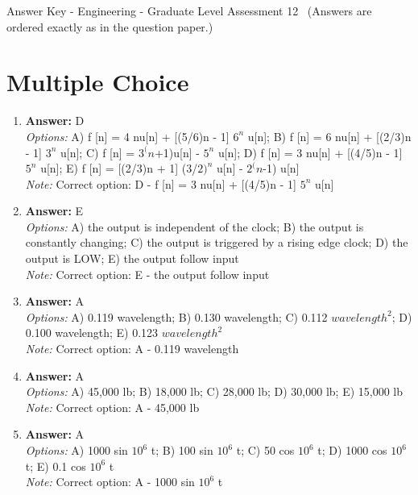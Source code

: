 \documentclass[12pt]{article}
\begin{document}
\begin{center}
Answer Key - Engineering - Graduate Level Assessment 12 \
\small (Answers are ordered exactly as in the question paper.)
\end{center}

\section*{Multiple Choice}
\begin{enumerate}[label=\arabic*.]
\item \textbf{Answer:} D
\\ \textit{Options:} A) f [n] = 4 nu[n] + [(5/6)n - 1] $6^n$ u[n]; B) f [n] = 6 nu[n] + [(2/3)n - 1] $3^n$ u[n]; C) f [n] = $3^(n$+1)u[n] - $5^n$ u[n]; D) f [n] = 3 nu[n] + [(4/5)n - 1] $5^n$ u[n]; E) f [n] = [(2/3)n + 1] (3/$2)^n$ u[n] - $2^(n$-1) u[n]
\\ \textit{Note:} Correct option: D - f [n] = 3 nu[n] + [(4/5)n - 1] $5^n$ u[n]
\item \textbf{Answer:} E
\\ \textit{Options:} A) the output is independent of the clock; B) the output is constantly changing; C) the output is triggered by a rising edge clock; D) the output is LOW; E) the output follow input
\\ \textit{Note:} Correct option: E - the output follow input
\item \textbf{Answer:} A
\\ \textit{Options:} A) 0.119 wavelength; B) 0.130 wavelength; C) 0.112 $wavelength^2$; D) 0.100 wavelength; E) 0.123 $wavelength^2$
\\ \textit{Note:} Correct option: A - 0.119 wavelength
\item \textbf{Answer:} A
\\ \textit{Options:} A) 45,000 lb; B) 18,000 lb; C) 28,000 lb; D) 30,000 lb; E) 15,000 lb
\\ \textit{Note:} Correct option: A - 45,000 lb
\item \textbf{Answer:} A
\\ \textit{Options:} A) 1000 sin $10^6$ t; B) 100 sin $10^6$ t; C) 50 cos $10^6$ t; D) 1000 cos $10^6$ t; E) 0.1 cos $10^6$ t
\\ \textit{Note:} Correct option: A - 1000 sin $10^6$ t
\end{enumerate}
\end{document}
